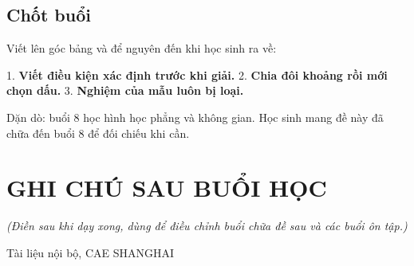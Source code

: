 \documentclass[11pt, a4paper]{article}
\begin{document}
\subsection{Chốt buổi}

Viết lên góc bảng và để nguyên đến khi học sinh ra về:

1. \textbf{Viết điều kiện xác định trước khi giải.}
2. \textbf{Chia đôi khoảng rồi mới chọn dấu.}
3. \textbf{Nghiệm của mẫu luôn bị loại.}

Dặn dò: buổi 8 học hình học phẳng và không gian. Học sinh mang đề này đã chữa đến buổi 8 để đối chiếu khi cần.

\section{GHI CHÚ SAU BUỔI HỌC}

\emph{(Điền sau khi dạy xong, dùng để điều chỉnh buổi chữa đề sau và các buổi ôn tập.)}

\vspace{0.8cm}
\begin{center}
{\footnotesize\color{cae_blue} Tài liệu nội bộ, CAE SHANGHAI}
\end{center}
\end{document}
